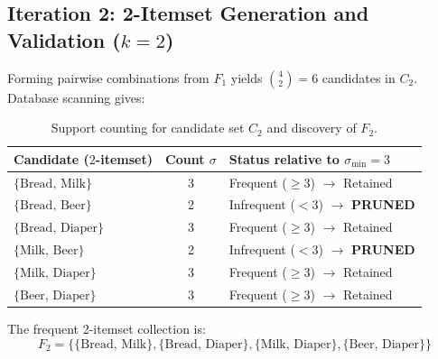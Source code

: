 \subsection{Iteration 2: 2-Itemset Generation and Validation ($k=2$)}
Forming pairwise combinations from $F_1$ yields $\binom{4}{2} = 6$ candidates in $C_2$. Database scanning gives:

\begin{table}[htbp]
\centering
\small
\renewcommand{\arraystretch}{1.2}
\begin{tabular}{l c l}
\toprule
\textbf{Candidate ($2$-itemset)} & \textbf{Count $\sigma$} & \textbf{Status relative to $\sigma_{\min} = 3$} \\
\midrule
$\{\text{Bread, Milk}\}$ & 3 & Frequent ($\ge 3$) $\rightarrow$ Retained \\
$\{\text{Bread, Beer}\}$ & 2 & Infrequent ($< 3$) $\rightarrow$ \textbf{PRUNED} \\
$\{\text{Bread, Diaper}\}$ & 3 & Frequent ($\ge 3$) $\rightarrow$ Retained \\
$\{\text{Milk, Beer}\}$ & 2 & Infrequent ($< 3$) $\rightarrow$ \textbf{PRUNED} \\
$\{\text{Milk, Diaper}\}$ & 3 & Frequent ($\ge 3$) $\rightarrow$ Retained \\
$\{\text{Beer, Diaper}\}$ & 3 & Frequent ($\ge 3$) $\rightarrow$ Retained \\
\bottomrule
\end{tabular}
\caption{Support counting for candidate set $C_2$ and discovery of $F_2$.}
\label{tab:dm-apriori-f2-en}
\end{table}

The frequent 2-itemset collection is:
\begin{equation}
F_2 = \{\{\text{Bread, Milk}\}, \{\text{Bread, Diaper}\}, \{\text{Milk, Diaper}\}, \{\text{Beer, Diaper}\}\}
\end{equation}

